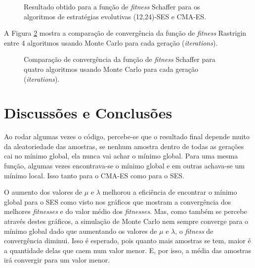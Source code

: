 \documentclass[brazil, 12pt]{article}
\begin{document}
\begin{figure}[H]
	\centering
	\caption{Resultado obtido para a função de \textit{fitness} Schaffer para os algoritmos de estratégias evolutivas (12,24)-SES e CMA-ES.}
	\label{fig:schaffer}
\end{figure}

A Figura \ref{fig:schaffer_montecarlo} mostra a comparação de convergência da função de \textit{fitness} Rastrigin entre 4 algoritmos usando Monte Carlo para cada geração (\textit{iterations}).

\begin{figure}[H]
	\centering
	\caption{Comparação de convergência da função de \textit{fitness} Schaffer para quatro algoritmos usando Monte Carlo para cada geração (\textit{iterations}).}
	\label{fig:schaffer_montecarlo}
\end{figure}

\section{Discussões e Conclusões}
Ao rodar algumas vezes o código, percebe-se que o resultado final depende muito da aleatoriedade das amostras, se nenhum amostra dentro de todas as gerações cai no mínimo global, ela nunca vai achar o mínimo global. Para uma mesma função, algumas vezes encontrava-se o mínimo global e em outras achava-se um mínimo local. Isso tanto para o CMA-ES como para o SES.

O aumento dos valores de $\mu$ e $\lambda$ melhorou a eficiência de encontrar o mínimo global para o SES como visto nos gráficos que mostram a convergência dos melhores \textit{fitnesses} e do valor médio dos \textit{fitnesses}. Mas, como também se percebe através destes gráficos, a simulação de Monte Carlo nem sempre converge para o mínimo global dado que aumentando os valores de $\mu$ e $\lambda$, o \textit{fitness} de convergência diminui. Isso é esperado, pois quanto mais amostras se tem, maior é a quantidade delas que caem num valor menor. E, por isso, a média das amostras irá convergir para um valor menor.
\end{document}
